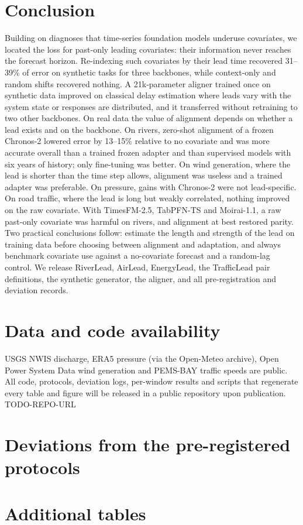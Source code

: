\documentclass[preprint,11pt,authoryear]{elsarticle}
\begin{document}
\section{Conclusion}
\label{sec:conclusion}

Building on diagnoses that time-series foundation models underuse covariates, we located the loss for past-only leading covariates: their information never reaches the forecast horizon. Re-indexing such covariates by their lead time recovered 31--39\% of error on synthetic tasks for three backbones, while context-only and random shifts recovered nothing. A 21k-parameter aligner trained once on synthetic data improved on classical delay estimation where leads vary with the system state or responses are distributed, and it transferred without retraining to two other backbones. On real data the value of alignment depends on whether a lead exists and on the backbone. On rivers, zero-shot alignment of a frozen Chronos-2 lowered error by 13--15\% relative to no covariate and was more accurate overall than a trained frozen adapter and than supervised models with six years of history; only fine-tuning was better. On wind generation, where the lead is shorter than the time step allows, alignment was useless and a trained adapter was preferable. On pressure, gains with Chronos-2 were not lead-specific. On road traffic, where the lead is long but weakly correlated, nothing improved on the raw covariate. With TimesFM-2.5, TabPFN-TS and Moirai-1.1, a raw past-only covariate was harmful on rivers, and alignment at best restored parity. Two practical conclusions follow: estimate the length and strength of the lead on training data before choosing between alignment and adaptation, and always benchmark covariate use against a no-covariate forecast and a random-lag control. We release RiverLead, AirLead, EnergyLead, the TrafficLead pair definitions, the synthetic generator, the aligner, and all pre-registration and deviation records.

\section*{Data and code availability}
USGS NWIS discharge, ERA5 pressure (via the Open-Meteo archive), Open Power System Data wind generation \citep{opsd2020} and PEMS-BAY traffic speeds \citep{li2018dcrnn} are public. All code, protocols, deviation logs, per-window results and scripts that regenerate every table and figure will be released in a public repository upon publication. \textsc{TODO-REPO-URL}




\appendix
\section{Deviations from the pre-registered protocols}
\label{app:deviations}
{\sloppy\small

\par}

\section{Additional tables}
\label{app:tables}


\end{document}
